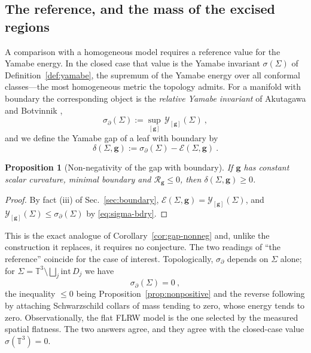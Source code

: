 \documentclass[aps,prd,reprint,amsmath,amssymb,nofootinbib,longbibliography]{revtex4-2}
\newcommand{\Torus}{\mathbb{T}}
\newcommand{\g}{\mathbf{g}}                 %
\newcommand{\Rs}{\mathcal{R}}               %
\newcommand{\sigbd}{\sigma_\partial}       %
\newcommand{\EH}{\mathcal{E}}               %
\newcommand{\Y}{\mathcal{Y}}                %
\theoremstyle{plain}
\newtheorem{proposition}[theorem]{Proposition}
\theoremstyle{definition}
\theoremstyle{remark}
\begin{document}
\subsection{The reference, and the mass of the excised regions}

A comparison with a homogeneous model requires a reference value for the Yamabe energy. In the closed case that value is the Yamabe invariant $\sigma(\Sigma)$ of Definition~\ref{def:yamabe}, the supremum of the Yamabe energy over all conformal classes---the most homogeneous metric the topology admits. For a manifold with boundary the corresponding object is the \emph{relative Yamabe invariant} of Akutagawa and Botvinnik \cite{MR1957657},
\begin{equation}
\label{eq:sigma-bdry}
\sigbd(\Sigma):=\sup_{[\g]}\,\Y_{[\g]}(\Sigma)\ ,
\end{equation}
and we define the Yamabe gap of a leaf with boundary by
\begin{equation}
\label{eq:gap-bdry}
\delta(\Sigma,\g):=\sigbd(\Sigma)-\EH(\Sigma,\g)\ .
\end{equation}

\begin{proposition}[Non-negativity of the gap with boundary]
\label{prop:gap-bdry-nonneg}
If $\g$ has constant scalar curvature, minimal boundary and $\Rs_\g\le0$, then $\delta(\Sigma,\g)\ge0$.
\end{proposition}
\begin{proof}
By fact (iii) of Sec.~\ref{sec:boundary}, $\EH(\Sigma,\g)=\Y_{[\g]}(\Sigma)$, and $\Y_{[\g]}(\Sigma)\le\sigbd(\Sigma)$ by \eqref{eq:sigma-bdry}.
\end{proof}

This is the exact analogue of Corollary~\ref{cor:gap-nonneg} and, unlike the construction it replaces, it requires no conjecture. The two readings of ``the reference'' coincide for the case of interest. Topologically, $\sigbd$ depends on $\Sigma$ alone; for $\Sigma=\Torus^3\setminus\bigsqcup_j\mathrm{int}\,D_j$ we have
\begin{equation}
\label{eq:sigma-torus}
\sigbd(\Sigma)=0\ ,
\end{equation}
the inequality $\le0$ being Proposition~\ref{prop:nonpositive} and the reverse following by attaching Schwarzschild collars of mass tending to zero, whose energy tends to zero. Observationally, the flat FLRW model is the one selected by the measured spatial flatness. The two answers agree, and they agree with the closed-case value $\sigma(\Torus^3)=0$.
\end{document}
